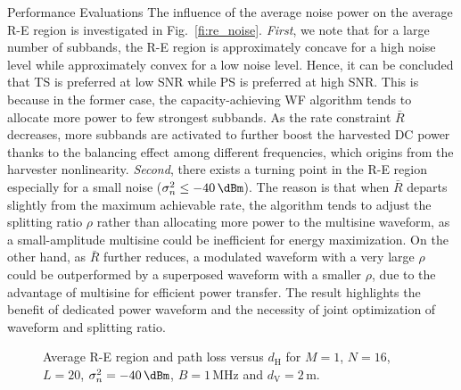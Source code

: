 \documentclass[journal]{IEEEtran}
\begin{document}
\begin{section}{Performance Evaluations}
		The influence of the average noise power on the average R-E region is investigated in Fig.~\ref{fi:re_noise}. \textit{First}, we note that for a large number of subbands, the R-E region is approximately concave for a high noise level while approximately convex for a low noise level. Hence, it can be concluded that TS is preferred at low SNR while PS is preferred at high SNR. This is because in the former case, the capacity-achieving WF algorithm tends to allocate more power to few strongest subbands. As the rate constraint $\bar{R}$ decreases, more subbands are activated to further boost the harvested DC power thanks to the balancing effect among different frequencies, which origins from the harvester nonlinearity. \textit{Second}, there exists a turning point in the R-E region especially for a small noise ($\sigma_n^2 \le -40\,\si{\dBm}$). The reason is that when $\bar{R}$ departs slightly from the maximum achievable rate, the algorithm tends to adjust the splitting ratio $\rho$ rather than allocating more power to the multisine waveform, as a small-amplitude multisine could be inefficient for energy maximization. On the other hand, as $\bar{R}$ further reduces, a modulated waveform with a very large $\rho$ could be outperformed by a superposed waveform with a smaller $\rho$, due to the advantage of multisine for efficient power transfer. The result highlights the benefit of dedicated power waveform and the necessity of joint optimization of waveform and splitting ratio.

		\begin{figure}[!t]
			\centering
			\caption{Average R-E region and path loss versus $d_{\mathrm{H}}$ for $M=1$, $N=16$, $L=20$, $\sigma_n^2=-40\,\si{\dBm}$, $B=1\,\si{\MHz}$ and $d_{\mathrm{V}}=2\,\si{\meter}$.}
		\end{figure}


\end{section}
\end{document}
